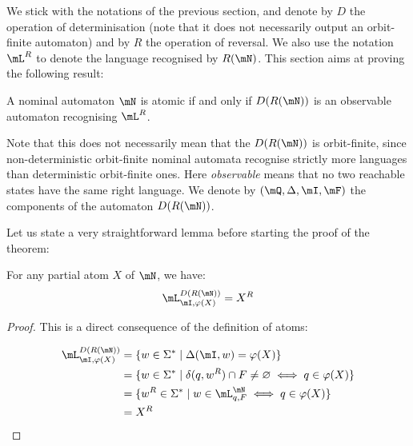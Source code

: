 \documentclass[a4paper, UKenglish, cleveref, autoref, numberwithinsect]{lipics-modified}
\begin{document}
We stick with the notations of the previous section, and denote by $D$ the operation of determinisation (note that it does not necessarily output an orbit-finite automaton) and by $R$ the operation of reversal. We also use the notation $\mL^R$ to denote the language recognised by $R(\mN)$. This section aims at proving the following result:

\begin{theorem}\label{thm-revdetmin}

A nominal automaton $\mN$ is atomic if and only if $D(R(\mN))$ is an observable automaton recognising $\mL^R$.

\end{theorem}

Note that this does not necessarily mean that the $D(R(\mN))$ is orbit-finite, since non-deterministic orbit-finite nominal automata recognise strictly more languages than deterministic orbit-finite ones. Here \textit{observable} means that no two reachable states have the same right language. We denote by $(\mQ,\Delta,\mI,\mF)$ the components of the automaton $D(R(\mN))$.

Let us state a very straightforward lemma before starting the proof of the theorem:

\begin{lemma}

For any partial atom $X$ of $\mN$, we have: $$\mL_{\mI,\varphi(X)}^{D(R(\mN))}=X^R$$

\end{lemma}

\begin{proof}

This is a direct consequence of the definition of atoms:

\begin{align*}\mL_{\mI,\varphi(X)}^{D(R(\mN))}&=\{w\in\Sigma^*\mid\Delta(\mI,w)=\varphi(X)\}\\
&=\{w\in\Sigma^*\mid\delta(q,w^R)\cap F\neq\varnothing\iff q\in\varphi(X)\}\\
&=\{w^R\in\Sigma^*\mid w\in\mL_{q,F}^\mN\iff q\in\varphi(X)\}\\
&=X^R
\end{align*}

\end{proof}
\end{document}
